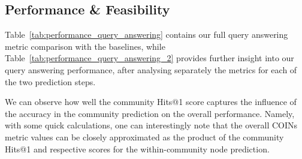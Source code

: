 \subsection{Performance \& Feasibility}

Table~\ref{tab:performance_query_answering} contains our full query answering metric comparison with the baselines, while Table~\ref{tab:performance_query_answering_2} provides further insight into our query answering performance, after analysing separately the metrics for each of the two prediction steps. 

We can observe how well the community Hits@1 score captures the influence of the accuracy in the community prediction on the overall performance. Namely, with some quick calculations, one can interestingly note that the overall COINs metric values can be closely approximated as the product of the community Hits@1 and respective scores for the within-community node prediction.

